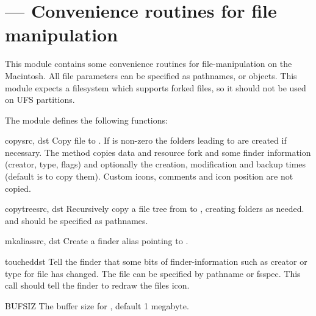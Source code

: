 \section{ ---
         Convenience routines for file manipulation}



This module contains some convenience routines for file-manipulation
on the Macintosh. All file parameters can be specified as
pathnames,  or  objects.  This module
expects a filesystem which supports forked files, so it should not
be used on UFS partitions.

The  module defines the following functions:


\begin{funcdesc}{copy}{src, dst}
Copy file  to .  If  is non-zero
the folders leading to  are created if necessary.
The method copies data and
resource fork and some finder information (creator, type, flags) and
optionally the creation, modification and backup times (default is to
copy them). Custom icons, comments and icon position are not copied.
\end{funcdesc}

\begin{funcdesc}{copytree}{src, dst}
Recursively copy a file tree from  to , creating
folders as needed.  and  should be specified as
pathnames.
\end{funcdesc}

\begin{funcdesc}{mkalias}{src, dst}
Create a finder alias  pointing to .
\end{funcdesc}

\begin{funcdesc}{touched}{dst}
Tell the finder that some bits of finder-information such as creator
or type for file  has changed. The file can be specified by
pathname or fsspec. This call should tell the finder to redraw the
files icon.
\end{funcdesc}

\begin{datadesc}{BUFSIZ}
The buffer size for , default 1 megabyte.
\end{datadesc}

